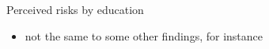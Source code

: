 \documentclass{beamer}
\begin{document}
\begin{frame}{Perceived risks by education}
\begin{figure}[ht]
\begin{subfigure}[b]{0.46\textwidth}
		\end{subfigure}
	\end{figure}
	\begin{itemize}
			\item not the same to some other findings, for instance  
			\cite{meghir2004income}
		\end{itemize}
\end{frame}


\end{document}
